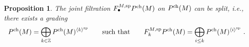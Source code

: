 \documentclass[11pt]{amsart}
\numberwithin{equation}{section}
\newtheorem{theo}{Theorem}[section]
\newtheorem{prop}[theo]{Proposition}
\theoremstyle{definition}
\newcommand{\bb}{\mathbb}
\newcommand{\mc}{\mathcal}
\newcommand{\mf}{\mathfrak}
\newcommand{\Rees}{{\textup{Rees}}}
\newcommand{\spe}{{\textup{sp}}}
\newcommand{\Kh}{{\K[\hbar]}}
\newcommand{\Kfph}{{\mathbb{K}[\![\hbar]\!]}}
\newcommand{\gd}{{\textup{gr}}}
\newcommand{\K}{{\bb K}}
\newcommand{\End}{{\textup{End}}}
\newcommand{\ch}{{\textup{ch}}}
\newcommand{\Ss}{{{\mf{S}}}}
\newcommand{\0}{{\textbf{0}}}
\newcommand{\DD}{{D}}
\newcommand{\gr}{\textup{gr}}
\newcommand{\Z}{\bb Z}
\def\IZ{\mathbb{Z}}
\def\ch{{\rm ch}}
\def \mf{\mathfrak}
\def \ie{{\it i.e.}}
\begin{document}
\subsubsection{} 








\begin{prop}\label{prop:joint split}
	The joint filtration $F_\bullet^{M,\spe} P^\ch(M)$ on $P^\ch(M)$ can be split, \ie, there exists a grading
	\[
	P^{\ch}(M) = \bigoplus_{k\in \IZ} P^{\ch}(M)^{\langle k \rangle^\spe} \qquad \text{such that}\qquad F_k^{M,\spe} P^\ch(M) = \bigoplus_{i\le k} P^\ch(M)^{\langle i\rangle^\spe}~.
	\]
\end{prop}



%
\end{document}
